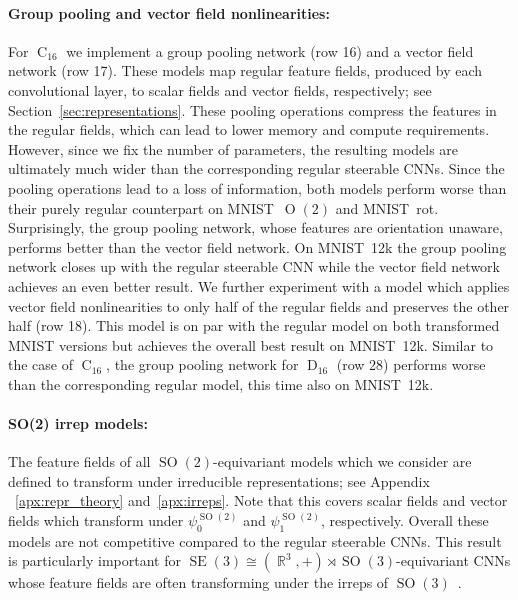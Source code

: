 \documentclass{article}
\newcommand{\apx}{Appendix\xspace
}
\DeclareMathOperator*{\R}{\mathbb{R}}
\newcommand{\SE}[1]{\ensuremath{\operatorname{SE}(#1)}}
\renewcommand{\O}[1]{\ensuremath{\operatorname{O}(#1)}}
\newcommand{\SO}[1]{\ensuremath{\operatorname{SO}(#1)}}
\newcommand{\D}[1]{\ensuremath{\operatorname{D}_{#1}}}
\newcommand{\C}[1]{\ensuremath{\operatorname{C}_{#1}}}
\begin{document}
\paragraph{Group pooling and vector field nonlinearities:}
For $\C{16}$ we implement a group pooling network (row 16) and a vector field network (row 17).
These models map regular feature fields, produced by each convolutional layer, to scalar fields and vector fields, respectively; see Section~\ref{sec:representations}.
These pooling operations compress the features in the regular fields, which can lead to lower memory and compute requirements.
However, since we fix the number of parameters, the resulting models are ultimately much wider than the corresponding regular steerable CNNs.
Since the pooling operations lead to a loss of information, both models perform worse than their purely regular counterpart on MNIST~$\O2$ and MNIST~rot.
Surprisingly, the group pooling network, whose features are orientation unaware, performs better than the vector field network.
On MNIST~12k the group pooling network closes up with the regular steerable CNN while the vector field network achieves an even better result.
We further experiment with a model which applies vector field nonlinearities to only half of the regular fields and preserves the other half (row 18).
This model is on par with the regular model on both transformed MNIST versions but achieves the overall best result on MNIST~12k.
Similar to the case of $\C{16}$, the group pooling network for $\D{16}$ (row 28) performs worse than the corresponding regular model, this time also on MNIST~12k.



\paragraph{SO(2) irrep models:}
The feature fields of all $\SO2$-equivariant models which we consider are defined to transform under irreducible representations; see \apx~\ref{apx:repr_theory} and~\ref{apx:irreps}.
Note that this covers scalar fields and vector fields which transform under $\psi_0^{\SO2}$ and $\psi_1^{\SO2}\!$, respectively.
Overall these models are not competitive compared to the regular steerable CNNs.
This result is particularly important for $\SE3\cong(\R^3,+)\rtimes\SO3$-equivariant CNNs whose feature fields are often transforming under the irreps of $\SO3$~\cite{TensorFieldNets,3d_steerableCNNs,Kondor2018-NBN,kondorClebschGordanNets2018,anderson2019cormorant}.
\end{document}
